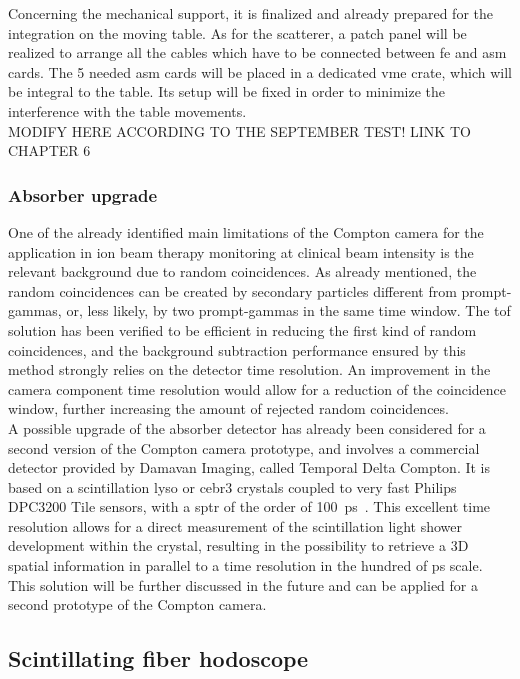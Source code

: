 Concerning the mechanical support, it is finalized and already prepared for the integration on the moving table. As for the scatterer, a patch panel will be realized to arrange all the cables which have to be connected between \gls{fe} and \gls{asm} cards. The 5 needed \gls{asm} cards will be placed in a dedicated \gls{vme} crate, which will be integral to the table. Its setup will be fixed in order to minimize the interference with the table movements.\\

MODIFY HERE ACCORDING TO THE SEPTEMBER TEST! LINK TO CHAPTER 6  

\subsubsection{Absorber upgrade}\label{chap3::subsubsec::absUpgrade} 

One of the already identified main limitations of the Compton camera for the application in ion beam therapy monitoring at clinical beam intensity is the relevant background due to random coincidences. As already mentioned, the random coincidences can be created by secondary particles different from prompt-gammas, or, less likely, by two prompt-gammas in the same time window. The \gls{tof} solution has been verified to be efficient in reducing the first kind of random coincidences, and the background subtraction performance ensured by this method strongly relies on the detector time resolution. An improvement in the camera component time resolution would allow for a reduction of the coincidence window, further increasing the amount of rejected random coincidences.\\ A possible upgrade of the absorber detector has already been considered for a second version of the Compton camera prototype, and involves a commercial detector provided by Damavan Imaging, called Temporal Delta Compton. It is based on a scintillation \gls{lyso} or \gls{cebr3} crystals coupled to very fast Philips DPC3200 Tile sensors, with a \gls{sptr} of the order of 100~ps~\parencite{Brunner2016}. This excellent time resolution allows for a direct measurement of the scintillation light shower development within the crystal, resulting in the possibility to retrieve a 3D spatial information in parallel to a time resolution in the hundred of ps scale. This solution will be further discussed in the future and can be applied for a second prototype of the Compton camera.  

\subsection{Scintillating fiber hodoscope}\label{chap3::subsec::hodoNext}

